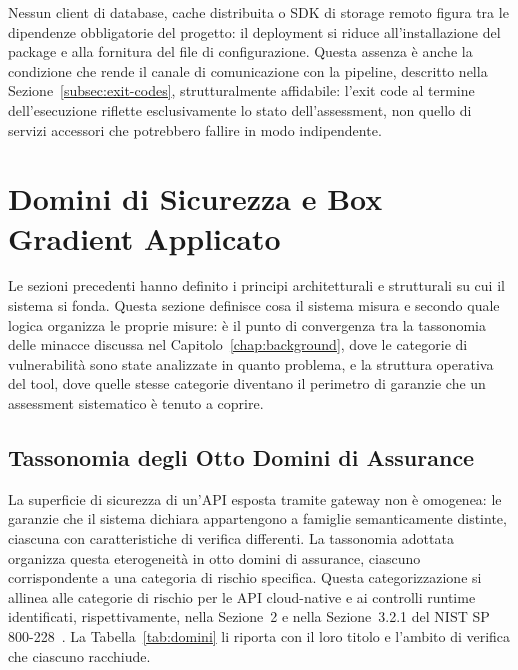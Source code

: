 Nessun client di database, cache distribuita o \gls{SDK} di storage remoto figura tra le dipendenze obbligatorie del progetto: il deployment si riduce all'installazione del package e alla fornitura del file di configurazione. Questa assenza è anche la condizione che rende il canale di comunicazione con la pipeline, descritto nella Sezione~\ref{subsec:exit-codes}, strutturalmente affidabile: l'exit code al termine dell'esecuzione riflette esclusivamente lo stato dell'assessment, non quello di servizi accessori che potrebbero fallire in modo indipendente.



















\section{Domini di Sicurezza e Box Gradient Applicato}\label{sec:domini}
Le sezioni precedenti hanno definito i principi architetturali e strutturali su cui il sistema si fonda.
Questa sezione definisce cosa il sistema misura e secondo quale logica organizza le proprie misure: è il punto di convergenza tra la tassonomia delle minacce discussa nel Capitolo~\ref{chap:background}, dove le categorie di vulnerabilità sono state analizzate in quanto problema, e la struttura operativa del tool, dove quelle stesse categorie diventano il perimetro di garanzie che un assessment sistematico è tenuto a coprire.


\subsection{Tassonomia degli Otto Domini di Assurance}\label{subsec:domini-tassonomia}

La superficie di sicurezza di un'\gls{API} esposta tramite gateway non è omogenea: le garanzie che il sistema dichiara appartengono a famiglie semanticamente distinte, ciascuna con caratteristiche di verifica differenti. La tassonomia adottata organizza questa eterogeneità in otto domini di assurance, ciascuno corrispondente a una categoria di rischio specifica.
Questa categorizzazione si allinea alle categorie di rischio per le API cloud-native e ai controlli runtime identificati, rispettivamente, nella Sezione~2 e nella Sezione~3.2.1 del NIST SP 800-228~\cite{chandramouliGuidelinesAPIProtection2026}.
La Tabella~\ref{tab:domini} li riporta con il loro titolo e l'ambito di verifica che ciascuno racchiude.

